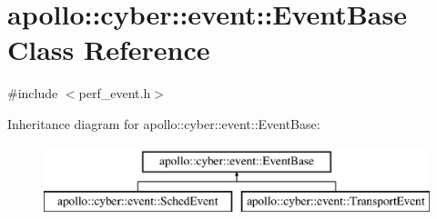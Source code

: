 \hypertarget{classapollo_1_1cyber_1_1event_1_1EventBase}{\section{apollo\-:\-:cyber\-:\-:event\-:\-:Event\-Base Class Reference}
\label{classapollo_1_1cyber_1_1event_1_1EventBase}
}


{\ttfamily \#include $<$perf\-\_\-event.\-h$>$}

Inheritance diagram for apollo\-:\-:cyber\-:\-:event\-:\-:Event\-Base\-:\begin{figure}[H]
\begin{center}
\leavevmode
\includegraphics[height=2.000000cm]{classapollo_1_1cyber_1_1event_1_1EventBase}
\end{center}
\end{figure}
